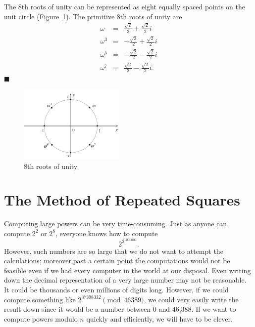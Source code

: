  
\vspace{2ex}
 
 
The 8th roots of unity can be represented as
eight equally spaced points on the unit circle (Figure~\ref{rtsunity}).  The
primitive 8th roots of unity are
\begin{eqnarray*}
\omega & = & \frac{\sqrt{2}}{2}  + \frac{\sqrt{2}}{2} i \\
\omega^3 & = & -\frac{\sqrt{2}}{2}  + \frac{\sqrt{2}}{2} i \\
\omega^5 & = & -\frac{\sqrt{2}}{2}  - \frac{\sqrt{2}}{2} i \\
\omega^7 & = & \frac{\sqrt{2}}{2}  - \frac{\sqrt{2}}{2}i. 
\end{eqnarray*}
\hspace{\fill} $\blacksquare$
 
 
 
\begin{figure}[hbt]
\begin{center}
\centerline {
\includegraphics[width=2in]{rtsunity}
}
\end{center}
\caption{8th roots of unity}
\label{rtsunity}
\end{figure}
 
 
 
 
\section[The Method of Repeated Squares]{The Method of Repeated
Squares\protect\footnotemark} 
 
 
Computing large powers can be very time-consuming. Just as anyone can
compute $2^2$ or $2^8$, everyone knows how to compute
$$
2^{2^{1000000} }.
$$
However, such numbers are so large that we do not want to attempt the
calculations; moreover,past a certain point the computations would not
be feasible even if we had every computer in the world at our
disposal. Even 
writing down the decimal representation of a very large number may not
be reasonable. It could be thousands or even millions of digits long.
However, if we could compute something like $2^{37398332 } \pmod{
46389}$, we could very easily write the result down since it would be a
number between 0 and 46,388. If we want to compute powers modulo $n$
quickly and efficiently, we will have to be clever. 
 
